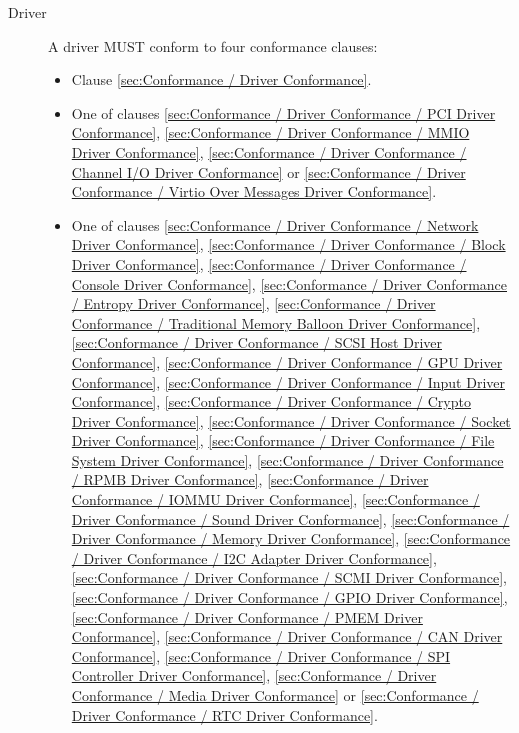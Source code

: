 \begin{description}
\item[Driver] A driver MUST conform to four conformance clauses:
  \begin{itemize}
    \item Clause \ref{sec:Conformance / Driver Conformance}.
    \item One of clauses \ref{sec:Conformance / Driver Conformance / PCI Driver Conformance}, \ref{sec:Conformance / Driver Conformance / MMIO Driver Conformance}, \ref{sec:Conformance / Driver Conformance / Channel I/O Driver Conformance} or \ref{sec:Conformance / Driver Conformance / Virtio Over Messages Driver Conformance}.
    \item One of clauses
\ref{sec:Conformance / Driver Conformance / Network Driver Conformance},
\ref{sec:Conformance / Driver Conformance / Block Driver Conformance},
\ref{sec:Conformance / Driver Conformance / Console Driver Conformance},
\ref{sec:Conformance / Driver Conformance / Entropy Driver Conformance},
\ref{sec:Conformance / Driver Conformance / Traditional Memory Balloon Driver Conformance},
\ref{sec:Conformance / Driver Conformance / SCSI Host Driver Conformance},
\ref{sec:Conformance / Driver Conformance / GPU Driver Conformance},
\ref{sec:Conformance / Driver Conformance / Input Driver Conformance},
\ref{sec:Conformance / Driver Conformance / Crypto Driver Conformance},
\ref{sec:Conformance / Driver Conformance / Socket Driver Conformance},
\ref{sec:Conformance / Driver Conformance / File System Driver Conformance},
\ref{sec:Conformance / Driver Conformance / RPMB Driver Conformance},
\ref{sec:Conformance / Driver Conformance / IOMMU Driver Conformance},
\ref{sec:Conformance / Driver Conformance / Sound Driver Conformance},
\ref{sec:Conformance / Driver Conformance / Memory Driver Conformance},
\ref{sec:Conformance / Driver Conformance / I2C Adapter Driver Conformance},
\ref{sec:Conformance / Driver Conformance / SCMI Driver Conformance},
\ref{sec:Conformance / Driver Conformance / GPIO Driver Conformance},
\ref{sec:Conformance / Driver Conformance / PMEM Driver Conformance},
\ref{sec:Conformance / Driver Conformance / CAN Driver Conformance},
\ref{sec:Conformance / Driver Conformance / SPI Controller Driver Conformance},
\ref{sec:Conformance / Driver Conformance / Media Driver Conformance} or
\ref{sec:Conformance / Driver Conformance / RTC Driver Conformance}.


\end{itemize}
\end{description}
